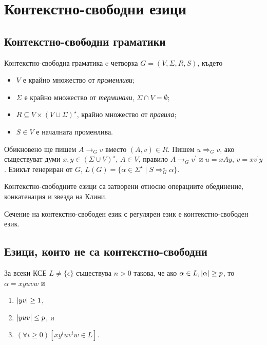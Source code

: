 \chapter{Контекстно-свободни езици}

\section{Контекстно-свободни граматики}
\begin{dfn}
  Контекстно-свободна граматика e четворка $G = (V,\Sigma,R,S)$,
  където
  \begin{itemize}
  \item
    $V$ е крайно множество от {\em променливи};
  \item
    $\Sigma$ е крайно множество от {\em терминали}, $\Sigma \cap V = \emptyset$;
  \item
    $R \subseteq V\times (V\cup\Sigma)^\star$, крайно множество от {\em правила};
  \item
    $S \in V$ е началната променлива. 
  \end{itemize}
  Обикновено ще пишем $A \rightarrow_G v$ вместо $(A,v) \in R$.
  Пишем $u \Rightarrow_G v$, ако съществуват думи $x,y\in (\Sigma\cup V)^\star$, $A\in V$,
  правило $A\rightarrow_G v^\prime$ и $u = xAy$, $v = xv^\prime y$.
  Езикът генериран от $G$, $L(G) = \{\alpha\in\Sigma^\star\mid S \Rightarrow^\star_G \alpha\}$.
\end{dfn}

\begin{thm}
  Контекстно-свободните езици са затворени относно
  операциите обединение, конкатенация и звезда на Клини.
\end{thm}

\begin{thm}
  Сечение на контекстно-свободен език с регулярен език е контекстно-свободен език.
\end{thm}

\section{Езици, които не са контекстно-свободни}

\begin{lemma}
  \label{lem:pumping-context}
  За всеки КСЕ $L\neq\{\epsilon\}$ съществува $n>0$ такова,
  че ако $\alpha\in L, \vert{\alpha}\vert \geq p$, то $\alpha=xyuvw$ и
  \begin{enumerate}
  \item
    $\vert{yv}\vert\geq 1$,
  \item
    $\vert{yuv}\vert\leq p$, и
  \item
    $(\forall i\geq 0)[xy^iuv^iw\in L]$.
\end{enumerate}
\end{lemma}

